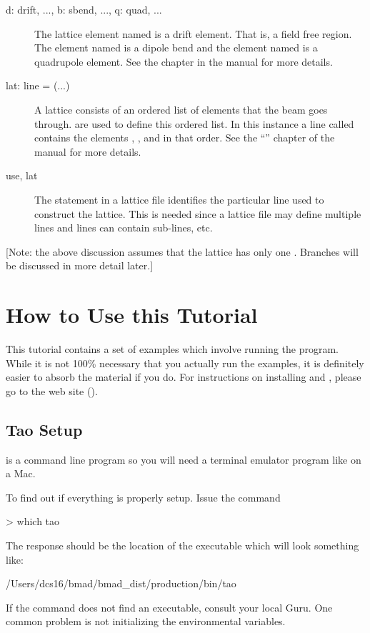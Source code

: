 \documentclass{hitec}
\newcommand{\Section}[1]{\section{#1}\vspace*{-1ex}}
\begin{document}
\begin{description}
  \item[d: drift, ..., b: sbend, ..., q: quad, ...] \Newline
The lattice element named  is a drift element. That is, a field free region. The element named 
is a dipole bend and the element named  is a quadrupole element. See the 
chapter in the \bmad manual for more details.
  \item[lat: line = (...)] \Newline
A lattice consists of an ordered list of elements that the beam goes through.  are used
to define this ordered list. In this instance a line called  contains the elements
, , and  in that order. 
See the ``'' chapter of the \bmad manual for more details.
  \item[use, lat] \Newline
The  statement in a lattice file identifies the particular line used to construct the
lattice. This is needed since a lattice file may define multiple lines and lines can contain
sub-lines, etc.
  \end{description}

[Note: the above discussion assumes that the lattice has only one . Branches will be
discussed in more detail later.]

\Section{How to Use this Tutorial}

This tutorial contains a set of examples which involve running the \tao program.  While it is not
100\% necessary that you actually run the examples, it is definitely easier to absorb the material
if you do. For instructions on installing \bmad and \tao, please go to the \bmad web site
().

\subsection{Tao Setup}

\tao is a command line program so you will need a terminal emulator program like  on a
Mac.

To find out if everything is properly setup. Issue the command
\begin{code}
> which tao
\end{code}
The response should be the location of the \tao executable which will look something like:
\begin{code}
/Users/dcs16/bmad/bmad_dist/production/bin/tao
\end{code}
If the  command does not find an executable, consult your local \bmad Guru. One common
problem is not initializing the \bmad environmental variables.
\end{document}
